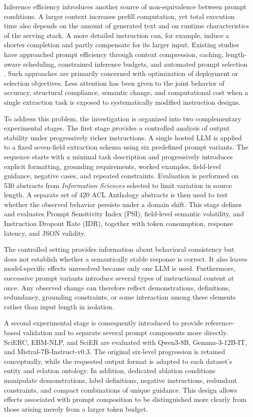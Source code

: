 \documentclass[fleqn,10pt]{wlscirep-authoryear}
\begin{document}
Inference efficiency introduces another source of non-equivalence between prompt
conditions. A larger context increases prefill computation, yet total execution
time also depends on the amount of generated text and on runtime characteristics
of the serving stack. A more detailed instruction can, for example, induce a
shorter completion and partly compensate for its larger input. Existing studies
have approached prompt efficiency through context compression, caching,
length-aware scheduling, constrained inference budgets, and automated prompt
selection
\cite{Bari2025,Song2026,Li20251748,Soman2024,morales2025impromptu}.
Such approaches are primarily concerned with optimization of deployment or
selection objectives. Less attention has been given to the joint behavior of
accuracy, structural compliance, semantic change, and computational cost when a
single extraction task is exposed to systematically modified instruction designs.

To address this problem, the investigation is organized into two complementary
experimental stages. The first stage provides a controlled analysis of output
stability under progressively richer instructions. A single hosted LLM is applied
to a fixed seven-field extraction schema using six predefined prompt variants.
The sequence starts with a minimal task description and progressively introduces
explicit formatting, grounding requirements, worked examples, field-level
guidance, negative cases, and repeated constraints. Evaluation is performed on
530 abstracts from \emph{Information Sciences} selected to limit variation in
source length. A separate set of 420 ACL Anthology abstracts is then used to test
whether the observed behavior persists under a domain shift. This stage defines
and evaluates Prompt Sensitivity Index (PSI), field-level semantic volatility,
and Instruction Dropout Rate (IDR), together with token consumption, response
latency, and JSON validity.

The controlled setting provides information about behavioral consistency but
does not establish whether a semantically stable response is correct. It also
leaves model-specific effects unresolved because only one LLM is used.
Furthermore, successive prompt variants introduce several types of instructional
content at once. Any observed change can therefore reflect demonstrations,
definitions, redundancy, grounding constraints, or some interaction among these
elements rather than input length in isolation.

A second experimental stage is consequently introduced to provide
reference-based validation and to separate several prompt components more
directly. SciERC, EBM-NLP, and SciER are evaluated with Qwen3-8B,
Gemma-3-12B-IT, and Mistral-7B-Instruct-v0.3. The original six-level progression
is retained conceptually, while the requested output format is adapted to each
dataset's entity and relation ontology. In addition, dedicated ablation
conditions manipulate demonstrations, label definitions, negative instructions,
redundant constraints, and compact combinations of unique guidance. This design
allows effects associated with prompt composition to be distinguished more
clearly from those arising merely from a larger token budget.
\end{document}
